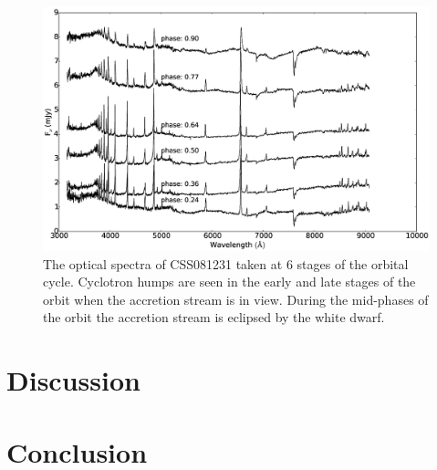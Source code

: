 \documentclass[11pt,a4paper]{report}      %
\begin{document}
\begin{figure}
\centering
\includegraphics[width=\textwidth]{images/CSS081231_spectra.eps}
\caption[Caption for spectra]{The optical spectra of CSS081231 taken at 6 stages of the orbital cycle. Cyclotron humps are seen in the early and late stages of the orbit when the accretion stream is in view. During the mid-phases of the orbit the accretion stream is eclipsed by the white dwarf. }
\label{fig:spectra}
\end{figure}

\section{Discussion}

\section{Conclusion}




\end{document}
